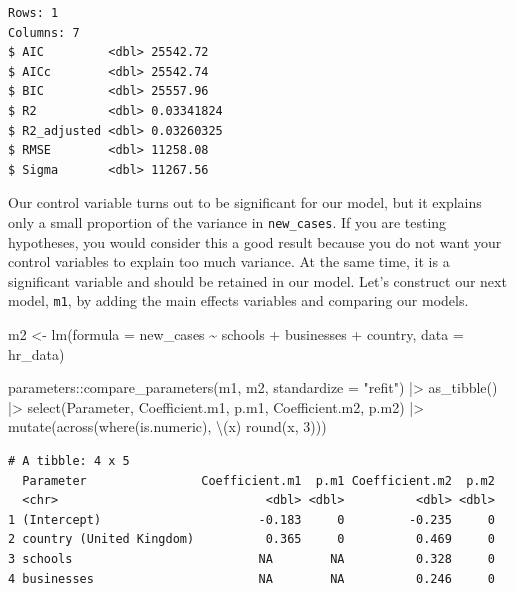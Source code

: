 \documentclass[
  letterpaper,
  DIV=11,
  numbers=noendperiod]{scrreprt}
\newenvironment{Shaded}{\begin{snugshade}}{\end{snugshade}}
\newcommand{\AttributeTok}[1]{\textcolor[rgb]{0.40,0.45,0.13}{#1}}
\newcommand{\DecValTok}[1]{\textcolor[rgb]{0.68,0.00,0.00}{#1}}
\newcommand{\FunctionTok}[1]{\textcolor[rgb]{0.28,0.35,0.67}{#1}}
\newcommand{\NormalTok}[1]{\textcolor[rgb]{0.00,0.23,0.31}{#1}}
\newcommand{\OtherTok}[1]{\textcolor[rgb]{0.00,0.23,0.31}{#1}}
\newcommand{\SpecialCharTok}[1]{\textcolor[rgb]{0.37,0.37,0.37}{#1}}
\newcommand{\StringTok}[1]{\textcolor[rgb]{0.13,0.47,0.30}{#1}}
\begin{document}
\begin{verbatim}
Rows: 1
Columns: 7
$ AIC         <dbl> 25542.72
$ AICc        <dbl> 25542.74
$ BIC         <dbl> 25557.96
$ R2          <dbl> 0.03341824
$ R2_adjusted <dbl> 0.03260325
$ RMSE        <dbl> 11258.08
$ Sigma       <dbl> 11267.56
\end{verbatim}

Our control variable turns out to be significant for our model, but it
explains only a small proportion of the variance in \texttt{new\_cases}.
If you are testing hypotheses, you would consider this a good result
because you do not want your control variables to explain too much
variance. At the same time, it is a significant variable and should be
retained in our model. Let's construct our next model, \texttt{m1}, by
adding the main effects variables and comparing our models.

\begin{Shaded}
\begin{Highlighting}[]
\NormalTok{m2 }\OtherTok{\textless{}{-}} \FunctionTok{lm}\NormalTok{(}\AttributeTok{formula =}\NormalTok{ new\_cases }\SpecialCharTok{\textasciitilde{}}
\NormalTok{           schools }\SpecialCharTok{+}
\NormalTok{           businesses }\SpecialCharTok{+}
\NormalTok{           country,}
         \AttributeTok{data =}\NormalTok{ hr\_data)}

\NormalTok{parameters}\SpecialCharTok{::}\FunctionTok{compare\_parameters}\NormalTok{(m1, m2, }\AttributeTok{standardize =} \StringTok{"refit"}\NormalTok{) }\SpecialCharTok{|\textgreater{}}
  \FunctionTok{as\_tibble}\NormalTok{() }\SpecialCharTok{|\textgreater{}}
  \FunctionTok{select}\NormalTok{(Parameter, Coefficient.m1, p.m1, Coefficient.m2, p.m2) }\SpecialCharTok{|\textgreater{}}
  \FunctionTok{mutate}\NormalTok{(}\FunctionTok{across}\NormalTok{(}\FunctionTok{where}\NormalTok{(is.numeric), \textbackslash{}(x) }\FunctionTok{round}\NormalTok{(x, }\DecValTok{3}\NormalTok{)))}
\end{Highlighting}
\end{Shaded}

\begin{verbatim}
# A tibble: 4 x 5
  Parameter                Coefficient.m1  p.m1 Coefficient.m2  p.m2
  <chr>                             <dbl> <dbl>          <dbl> <dbl>
1 (Intercept)                      -0.183     0         -0.235     0
2 country (United Kingdom)          0.365     0          0.469     0
3 schools                          NA        NA          0.328     0
4 businesses                       NA        NA          0.246     0
\end{verbatim}
\end{document}
